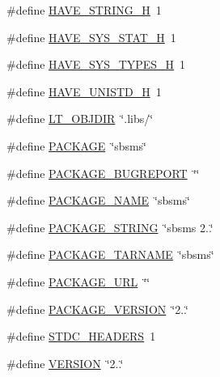 \begin{DoxyCompactItemize}
\#define \hyperlink{mac_2config_2i386_2lib-src_2sbsms_2src_2config_8h_ad4c234dd1625255dc626a15886306e7d}{H\+A\+V\+E\+\_\+\+S\+T\+R\+I\+N\+G\+\_\+H}~1
\item 
\#define \hyperlink{mac_2config_2i386_2lib-src_2sbsms_2src_2config_8h_ace156430ba007d19b4348a950d0c692b}{H\+A\+V\+E\+\_\+\+S\+Y\+S\+\_\+\+S\+T\+A\+T\+\_\+H}~1
\item 
\#define \hyperlink{mac_2config_2i386_2lib-src_2sbsms_2src_2config_8h_a69dc70bea5d1f8bd2be9740e974fa666}{H\+A\+V\+E\+\_\+\+S\+Y\+S\+\_\+\+T\+Y\+P\+E\+S\+\_\+H}~1
\item 
\#define \hyperlink{mac_2config_2i386_2lib-src_2sbsms_2src_2config_8h_a219b06937831d0da94d801ab13987639}{H\+A\+V\+E\+\_\+\+U\+N\+I\+S\+T\+D\+\_\+H}~1
\item 
\#define \hyperlink{mac_2config_2i386_2lib-src_2sbsms_2src_2config_8h_ac2d5925d76379847dd9fc4747b061659}{L\+T\+\_\+\+O\+B\+J\+D\+IR}~\char`\"{}.libs/\char`\"{}
\item 
\#define \hyperlink{mac_2config_2i386_2lib-src_2sbsms_2src_2config_8h_aca8570fb706c81df371b7f9bc454ae03}{P\+A\+C\+K\+A\+GE}~\char`\"{}sbsms\char`\"{}
\item 
\#define \hyperlink{mac_2config_2i386_2lib-src_2sbsms_2src_2config_8h_a1d1d2d7f8d2f95b376954d649ab03233}{P\+A\+C\+K\+A\+G\+E\+\_\+\+B\+U\+G\+R\+E\+P\+O\+RT}~\char`\"{}\char`\"{}
\item 
\#define \hyperlink{mac_2config_2i386_2lib-src_2sbsms_2src_2config_8h_a1c0439e4355794c09b64274849eb0279}{P\+A\+C\+K\+A\+G\+E\+\_\+\+N\+A\+ME}~\char`\"{}sbsms\char`\"{}
\item 
\#define \hyperlink{mac_2config_2i386_2lib-src_2sbsms_2src_2config_8h_ac73e6f903c16eca7710f92e36e1c6fbf}{P\+A\+C\+K\+A\+G\+E\+\_\+\+S\+T\+R\+I\+NG}~\char`\"{}sbsms 2..\char`\"{}
\item 
\#define \hyperlink{mac_2config_2i386_2lib-src_2sbsms_2src_2config_8h_af415af6bfede0e8d5453708afe68651c}{P\+A\+C\+K\+A\+G\+E\+\_\+\+T\+A\+R\+N\+A\+ME}~\char`\"{}sbsms\char`\"{}
\item 
\#define \hyperlink{mac_2config_2i386_2lib-src_2sbsms_2src_2config_8h_a5c93853116d5a50307b6744f147840aa}{P\+A\+C\+K\+A\+G\+E\+\_\+\+U\+RL}~\char`\"{}\char`\"{}
\item 
\#define \hyperlink{mac_2config_2i386_2lib-src_2sbsms_2src_2config_8h_aa326a05d5e30f9e9a4bb0b4469d5d0c0}{P\+A\+C\+K\+A\+G\+E\+\_\+\+V\+E\+R\+S\+I\+ON}~\char`\"{}2..\char`\"{}
\item 
\#define \hyperlink{mac_2config_2i386_2lib-src_2sbsms_2src_2config_8h_a550e5c272cc3cf3814651721167dcd23}{S\+T\+D\+C\+\_\+\+H\+E\+A\+D\+E\+RS}~1
\item 
\#define \hyperlink{mac_2config_2i386_2lib-src_2sbsms_2src_2config_8h_a1c6d5de492ac61ad29aec7aa9a436bbf}{V\+E\+R\+S\+I\+ON}~\char`\"{}2..\char`\"{}
\end{DoxyCompactItemize}


